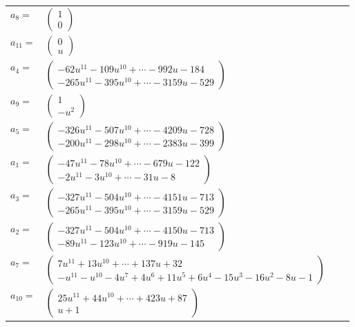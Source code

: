 \documentclass[1p]{elsarticle_modified}
\theoremstyle{definition}
\begin{document}
\begin{tabular}{m{7pt} m{180pt} m{7pt} m{180pt} }
\flushright $a_{8}=$&$\begin{pmatrix}1\\0\end{pmatrix}$ \\
\flushright $a_{11}=$&$\begin{pmatrix}0\\u\end{pmatrix}$ \\
\flushright $a_{4}=$&$\begin{pmatrix}-62 u^{11}-109 u^{10}+\cdots-992 u-184\\-265 u^{11}-395 u^{10}+\cdots-3159 u-529\end{pmatrix}$ \\
\flushright $a_{9}=$&$\begin{pmatrix}1\\- u^2\end{pmatrix}$ \\
\flushright $a_{5}=$&$\begin{pmatrix}-326 u^{11}-507 u^{10}+\cdots-4209 u-728\\-200 u^{11}-298 u^{10}+\cdots-2383 u-399\end{pmatrix}$ \\
\flushright $a_{1}=$&$\begin{pmatrix}-47 u^{11}-78 u^{10}+\cdots-679 u-122\\-2 u^{11}-3 u^{10}+\cdots-31 u-8\end{pmatrix}$ \\
\flushright $a_{3}=$&$\begin{pmatrix}-327 u^{11}-504 u^{10}+\cdots-4151 u-713\\-265 u^{11}-395 u^{10}+\cdots-3159 u-529\end{pmatrix}$ \\
\flushright $a_{2}=$&$\begin{pmatrix}-327 u^{11}-504 u^{10}+\cdots-4150 u-713\\-89 u^{11}-123 u^{10}+\cdots-919 u-145\end{pmatrix}$ \\
\flushright $a_{7}=$&$\begin{pmatrix}7 u^{11}+13 u^{10}+\cdots+137 u+32\\- u^{11}- u^{10}-4 u^7+4 u^6+11 u^5+6 u^4-15 u^3-16 u^2-8 u-1\end{pmatrix}$ \\
\flushright $a_{10}=$&$\begin{pmatrix}25 u^{11}+44 u^{10}+\cdots+423 u+87\\u+1\end{pmatrix}$ \\

\end{tabular}
\end{document}
